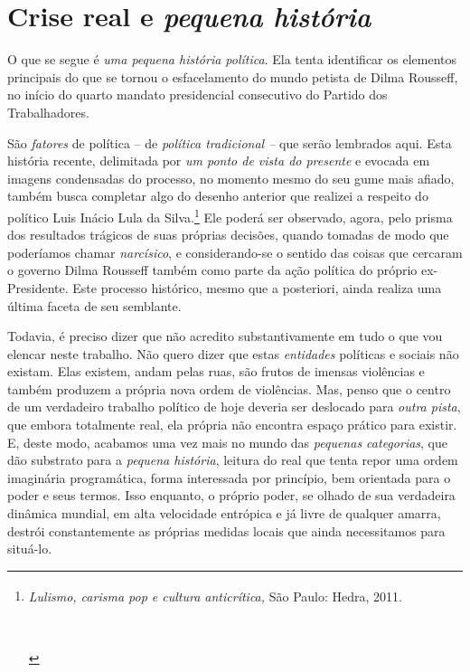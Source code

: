 \section{Crise real e \emph{pequena
  história}}\label{crise-real-e-pequena-histuxf3ria}


O que se segue é \emph{uma pequena história política}. Ela tenta
identificar os elementos principais do que se tornou o esfacelamento do
mundo petista de Dilma Rousseff, no início do quarto mandato
presidencial consecutivo do Partido dos Trabalhadores.

São \emph{fatores} de política -- de \emph{política tradicional --} que
serão lembrados aqui. Esta história recente, delimitada por \emph{um
ponto de vista do presente} e evocada em imagens condensadas do
processo, no momento mesmo do seu gume mais afiado, também busca
completar algo do desenho anterior que realizei a respeito do político
Luis Inácio Lula da Silva.\footnote{\emph{Lulismo, carisma pop e cultura
  anticrítica,} São Paulo: Hedra, 2011.\textsuperscript{\\\\\\\\}} Ele
poderá ser observado, agora, pelo prisma dos resultados trágicos de suas
próprias decisões, quando tomadas de modo que poderíamos chamar
\emph{narcísico}, e considerando-se o sentido das coisas que cercaram o
governo Dilma Rousseff também como parte da ação política do próprio
ex-Presidente. Este processo histórico, mesmo que a posteriori, ainda
realiza uma última faceta de seu semblante.

Todavia, é preciso dizer que não acredito substantivamente em tudo o que
vou elencar neste trabalho. Não quero dizer que estas \emph{entidades}
políticas e sociais não existam. Elas existem, andam pelas ruas, são
frutos de imensas violências e também produzem a própria nova ordem de
violências. Mas, penso que o centro de um verdadeiro trabalho político
de hoje deveria ser deslocado para \emph{outra pista}, que embora
totalmente real, ela própria não encontra espaço prático para existir.
E, deste modo, acabamos uma vez mais no mundo das \emph{pequenas
categorias}, que dão substrato para a \emph{pequena história}, leitura
do real que tenta repor uma ordem imaginária programática, forma
interessada por princípio, bem orientada para o poder e seus termos.
Isso enquanto, o próprio poder, se olhado de sua verdadeira dinâmica
mundial, em alta velocidade entrópica e já livre de qualquer amarra,
destrói constantemente as próprias medidas locais que ainda necessitamos
para situá-lo.

